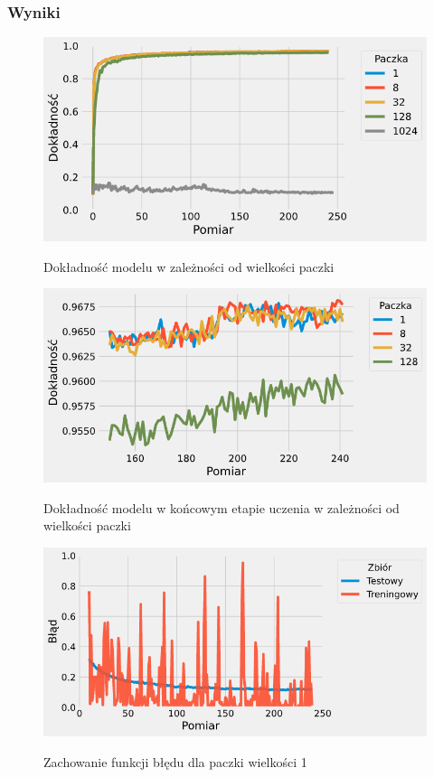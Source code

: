 \documentclass{article}
\begin{document}
\subsubsection*{Wyniki}
\begin{figure}[H]
	\centering
	\caption{Dokładność modelu w zależności od wielkości paczki}
	\includegraphics[width=\textwidth]{batch_acc.png}
	\label{fig:res21}
\end{figure}
\begin{figure}[H]
	\centering
	\caption{Dokładność modelu w końcowym etapie uczenia w zależności od wielkości paczki}
	\includegraphics[width=\textwidth]{batch_acc_zoom.png}
	\label{fig:res22}
\end{figure}
\begin{figure}[H]
	\centering
	\caption{Zachowanie funkcji błędu dla paczki wielkości 1}
	\includegraphics[width=\textwidth]{batch_err_1.png}
	\label{fig:res23}
\end{figure}
\end{document}
